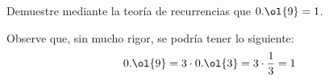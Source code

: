 \begin{ejercicio}
    Demuestre mediante la teoría de recurrencias que $0.\ol{9}=1$.
    \begin{observacion}
        Observe que, sin mucho rigor, se podría tener lo siguiente:
        \begin{equation*}
            0.\ol{9} = 3\cdot 0.\ol{3} = 3\cdot \dfrac{1}{3} = 1
        \end{equation*}
    \end{observacion}
\end{ejercicio}

